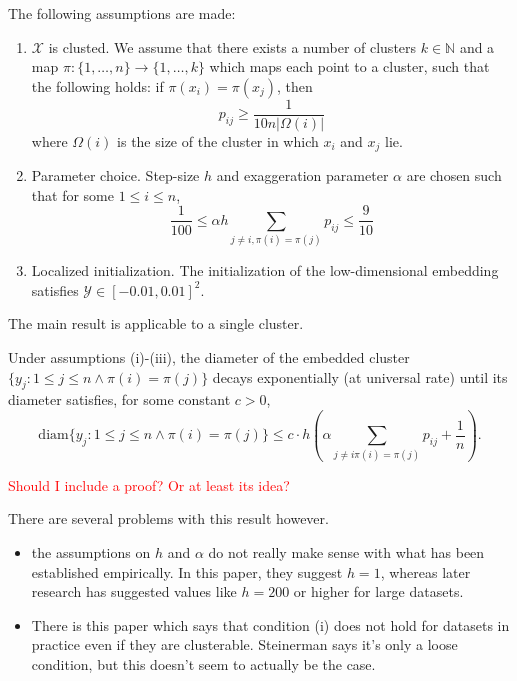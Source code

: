 The following assumptions are made: 
\begin{enumerate}
    \item $\mathcal{X}$ is clusted. We assume that there exists a number of clusters $k \in \mathbb{N}$ and a map $\pi: \{1,\dots,n\} \to \{1,\dots,k\}$ which maps each point to a cluster, such that the following holds: if $\pi(x_i) = \pi(x_j)$, then \begin{equation}
        p_{ij} \geq \frac{1}{10 n |\Omega(i)|}
    \end{equation}
    where $\Omega(i)$ is the size of the cluster in which $x_i$ and $x_j$ lie. 
    \item Parameter choice. Step-size $h$ and exaggeration parameter $\alpha$ are chosen such that for some $1\leq i \leq n$, 
    \begin{equation}
        \frac{1}{100} \leq \alpha h \sum_{j \neq i, \pi(i) = \pi(j)} p_{ij} \leq \frac{9}{10}
    \end{equation}
    \item Localized initialization. The initialization of the low-dimensional embedding satisfies $\mathcal{Y} \in [-0.01, 0.01]^2$. 
\end{enumerate}
The main result is applicable to a single cluster. 

\begin{thm}
    Under assumptions (i)-(iii), the diameter of the embedded cluster $\{y_j: 1 \leq j \leq n \land \pi(i) = \pi(j)\}$ decays exponentially (at universal rate) until its diameter satisfies, for some constant $c > 0$,
    \begin{equation}
        \text{diam} \{y_j: 1 \leq j \leq n \land \pi(i) = \pi(j)\} \leq c \cdot h \left(\alpha \sum_{j \neq i \pi(i) = \pi(j)} p_{ij} + \frac{1}{n} \right). 
    \end{equation}
\end{thm}
\textcolor{red}{Should I include a proof? Or at least its idea?}

There are several problems with this result however. 
\begin{itemize}
    \item the assumptions on $h$ and $\alpha$ do not really make sense with what has been established empirically. In this paper, they suggest $h=1$, whereas later research has suggested values like $h=200$ or higher for large datasets. 
    \item There is this paper which says that condition (i) does not hold for datasets in practice even if they are clusterable. Steinerman says it's only a loose condition, but this doesn't seem to actually be the case. 
\end{itemize}

